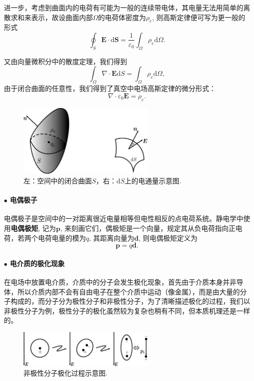 \documentclass[10pt,reqno, final]{ctexart}
\begin{document}
进一步，考虑到曲面内的电荷有可能为一般的连续带电体，其电量无法用简单的离散求和来表示，故设曲面内部$\Omega$的电荷体密度为$\rho_e$,  则高斯定律便可写为更一般的形式
\begin{equation}\label{gaussint}
\displaystyle \oint_{S}\bm{E}\cdot \mathrm{d}\bm{S} =\frac{1}{\varepsilon_0} \int_\Omega \rho_e \mathrm{d}\Omega.
\end{equation}

又由向量微积分中的散度定理，我们得到
\begin{equation}\label{gaussdiv}
\int_\Omega \nabla\cdot \bm{E} \mathrm{d}S = \int_\Omega \rho_e\mathrm{d}\Omega,
\end{equation}
由于闭合曲面的任意性，我们得到了真空中电场高斯定律的微分形式：
\begin{equation}\label{gaussthmdiff}
\nabla\cdot \varepsilon_0 \bm{E} = \rho_e.
\end{equation}

\begin{figure}[htp]
	\centering
	\includegraphics[width=0.6\textwidth]{Figures/GaussThmFig}
	\caption {左：空间中的闭合曲面$S$，右：$\mathrm{d}S$上的电通量示意图. }
	\label{gaussthm}
\end{figure}
\newpage

\paragraph{$\bullet$ 电偶极子} 电偶极子是空间中的一对距离很近电量相等但电性相反的点电荷系统。静电学中使用\textbf{电偶极矩}, 记为$\bm{p}$, 来刻画它们，偶极矩是一个向量，规定其从负电荷指向正电荷，若两个电荷电量的模为$q$, 其距离向量为$\bm{d}$, 则电偶极矩定义为
\begin{equation}\label{dipole}
\bm{p} = q\bm{d}.
\end{equation}

\paragraph{$\bullet$ 电介质的极化现象} 在电场中放置电介质，介质中的分子会发生极化现象，首先由于介质本身并非导体，所以介质内部不会有自由电子在整个介质中运动（像金属），而是由大量的分子构成的，而分子分为极性分子和非极性分子，为了清晰描述极化的过程，我们以非极性分子为例，极性分子的极化虽然较为复杂也稍有不同，但本质机理还是一样的。
\begin{figure}[htp]
	\centering
	\includegraphics[width=0.6\textwidth]{Figures/polarlization}
	\caption {非极性分子极化过程示意图. }
	\label{polarlization}
\end{figure}
\end{document}
